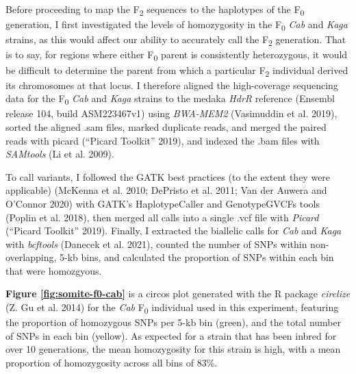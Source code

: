 \documentclass[
]{book}
\begin{document}
Before proceeding to map the F\textsubscript{2} sequences to the haplotypes of the F\textsubscript{0} generation, I first investigated the levels of homozygosity in the F\textsubscript{0} \emph{Cab} and \emph{Kaga} strains, as this would affect our ability to accurately call the F\textsubscript{2} generation. That is to say, for regions where either F\textsubscript{0} parent is consistently heterozygous, it would be difficult to determine the parent from which a particular F\textsubscript{2} individual derived its chromosomes at that locus. I therefore aligned the high-coverage sequencing data for the F\textsubscript{0} \emph{Cab} and \emph{Kaga} strains to the medaka \emph{HdrR} reference (Ensembl release 104, build ASM223467v1) using \emph{BWA-MEM2} (Vasimuddin et al. 2019), sorted the aligned .sam files, marked duplicate reads, and merged the paired reads with picard ({``Picard Toolkit''} 2019), and indexed the .bam files with \emph{SAMtools} (Li et al. 2009).

To call variants, I followed the GATK best practices (to the extent they were applicable) (McKenna et al. 2010; DePristo et al. 2011; Van der Auwera and O'Connor 2020) with GATK's HaplotypeCaller and GenotypeGVCFs tools (Poplin et al. 2018), then merged all calls into a single .vcf file with \emph{Picard} ({``Picard Toolkit''} 2019). Finally, I extracted the biallelic calls for \emph{Cab} and \emph{Kaga} with \emph{bcftools} (Danecek et al. 2021), counted the number of SNPs within non-overlapping, 5-kb bins, and calculated the proportion of SNPs within each bin that were homozgyous.

\textbf{Figure \ref{fig:somite-f0-cab}} is a circos plot generated with the R package \emph{circlize} (Z. Gu et al. 2014) for the \emph{Cab} F\textsubscript{0} individual used in this experiment, featuring the proportion of homozygous SNPs per 5-kb bin (green), and the total number of SNPs in each bin (yellow). As expected for a strain that has been inbred for over 10 generations, the mean homozygosity for this strain is high, with a mean proportion of homozygosity across all bins of 83\%.
\end{document}
